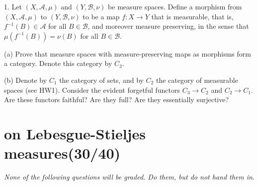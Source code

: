 \documentclass[lang=cn,11pt]{elegantbook}
\begin{document}
1. Let \((X, \mathcal{A}, \mu)\) and \((Y, \mathcal{B}, \nu)\) be measure spaces. Define a morphism from \((X, \mathcal{A}, \mu)\) to \((Y, \mathcal{B}, \nu)\) to be a map \(f : X \to Y\) that is measurable, that is, \(f^{-1}(B) \in \mathcal{A}\) for all \(B \in \mathcal{B}\), and moreover measure preserving, in the sense that \(\mu(f^{-1}(B)) = \nu(B)\) for all \(B \in \mathcal{B}\).

(a) Prove that measure spaces with measure-preserving maps as morphisms form a category. Denote this category by \(C_3\).

(b) Denote by \(C_1\) the category of sets, and by \(C_2\) the category of measurable spaces (see HW1). Consider the evident forgetful functors \(C_3 \to C_2\) and \(C_2 \to C_1\). Are these functors faithful? Are they full? Are they essentially surjective?












\chapter{on Lebesgue-Stieljes measures(30/40)}

\begin{center}
\textit{None of the following questions will be graded. Do them, but do not hand them in}.
\end{center}
\end{document}
